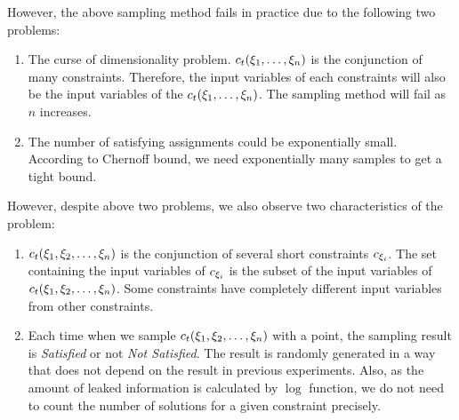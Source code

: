 However, the above sampling method fails in practice due to the following two problems:

\begin{enumerate}
      \item The curse of dimensionality problem. $c_t({{\xi}_{1}},\ldots,{{\xi}_{n}})$ is
            the conjunction of many constraints. Therefore, the input variables
            of each constraints will also be the input variables of the
            $c_t({{\xi}_{1}},\ldots,{{\xi}_{n}})$. The sampling method will fail
            as $n$ increases. 


      \item The number of satisfying assignments could be exponentially small.
            According to Chernoff bound, we need exponentially many samples to
            get a tight bound. 
\end{enumerate}

However, despite above two problems, we also observe two characteristics of the
problem:
\begin{enumerate}
      \item $c_t({{\xi}_{1}},{{\xi}_{2}},\ldots,{{\xi}_{n}})$ is the conjunction of
            several short constraints $c_{{\xi}_{i}}$. The set containing the
            input variables of $c_{{\xi}_{i}}$ is the subset of the input
            variables of $c_t({{\xi}_{1}},{{\xi}_{2}},\ldots,{{\xi}_{n}})$. Some
            constraints have completely different input variables from other
            constraints.

            \item Each time when we sample $c_t({{\xi}_{1}},{{\xi}_{2}},\ldots,{{\xi}_{n}})$
            with a point, the sampling result is \emph{Satisfied} or not \emph{Not Satisfied}.
            The result is randomly generated in a way that does not depend on the result in 
            previous experiments. Also, as the amount of leaked information is calculated
            by $\log$ function, we do not need to count the number of solutions for 
            a given constraint precisely.

\end{enumerate}

